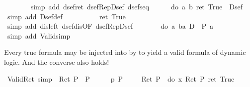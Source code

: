 \begin{isabellebody}
\ \ \ \ \ \ \isamarkupfalse%
\ {\isacharparenleft}simp\ add{\isacharcolon}\ dsef{\isacharunderscore}ret\ dsef{\isacharunderscore}Rep{\isacharunderscore}Dsef\ dsef{\isacharunderscore}seq{\isacharparenright}\isanewline
\ \ \ \ \isamarkupfalse%
\ {\isachardoublequote}do\ {\isacharbraceleft}a{\isasymleftarrow}{\isasymDown}\ b{\isacharsemicolon}\ ret\ True{\isacharbraceright}\ {\isasymin}\ Dsef{\isachardoublequote}\ \isamarkupfalse%
\ {\isacharparenleft}simp\ add{\isacharcolon}\ Dsef{\isacharunderscore}def{\isacharparenright}\isanewline
\ \ \isamarkupfalse%
\isanewline
\ \ \isamarkupfalse%
\ \isamarkupfalse%
\ {\isachardoublequote}{\isasymdots}\ {\isacharequal}\ ret\ True{\isachardoublequote}\ \isamarkupfalse%
\ {\isacharparenleft}simp\ add{\isacharcolon}\ dis{\isacharunderscore}left{}\ dsef{\isacharunderscore}dis{\isacharbrackleft}OF\ dsef{\isacharunderscore}Rep{\isacharunderscore}Dsef{\isacharbrackright}{\isacharparenright}\isanewline
\ \ \isamarkupfalse%
\ \isamarkupfalse%
\ {\isachardoublequote}{\isasymturnstile}\ {\isasymUp}\ {\isacharparenleft}do\ {\isacharbraceleft}a{\isasymleftarrow}{\isasymDown}\ {\isacharparenleft}b{\isacharcolon}{\isacharcolon}{\isacharprime}a\ D{\isacharparenright}{\isacharsemicolon}\ {\isasymDown}\ {\isacharparenleft}P\ a{\isacharparenright}{\isacharbraceright}{\isacharparenright}{\isachardoublequote}\isanewline
\ \ \ \ \isamarkupfalse%
\ {\isacharparenleft}simp\ add{\isacharcolon}\ Valid{\isacharunderscore}simp{\isacharparenright}\isanewline
\isamarkupfalse%
\isamarkupfalse%
%
\begin{isamarkuptext}%
Every true formula may be injected into  by  to 
  yield a valid formula of dynamic logic. And the converse also holds!
  \label{isa:valid-ret}%
\end{isamarkuptext}%
\isamarkuptrue%
\ Valid{\isacharunderscore}Ret\ {\isacharbrackleft}simp{\isacharbrackright}{\isacharcolon}\ {\isachardoublequote}{\isacharparenleft}{\isasymturnstile}\ Ret\ P{\isacharparenright}\ {\isacharequal}\ P{\isachardoublequote}\isanewline
\isamarkupfalse%
\ \isanewline
\ \ \isamarkupfalse%
\ p{\isacharcolon}\ {\isachardoublequote}P{\isachardoublequote}\isanewline
\ \ \isamarkupfalse%
\ {\isachardoublequote}{\isasymDown}\ {\isacharparenleft}Ret\ P{\isacharparenright}\ {\isacharequal}\ do\ {\isacharbraceleft}x{\isasymleftarrow}{\isasymDown}\ {\isacharparenleft}Ret\ P{\isacharparenright}{\isacharsemicolon}\ ret\ True{\isacharbraceright}{\isachardoublequote}\isanewline

\end{isabellebody}
